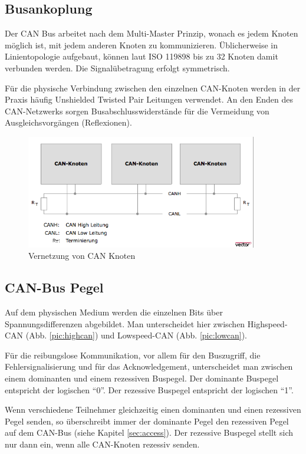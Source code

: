 \subsection{Busankoplung}

Der CAN Bus arbeitet nach dem Multi-Master Prinzip, wonach es jedem Knoten 
möglich ist, mit jedem anderen Knoten zu kommunizieren. Üblicherweise in 
Linientopologie aufgebaut, können laut ISO 119898 bis zu 32 Knoten damit
verbunden werden. Die Signalübetragung erfolgt symmetrisch.

Für die physische Verbindung zwischen den einzelnen CAN-Knoten werden in der Praxis
häufig Unshielded Twisted Pair Leitungen verwendet. An den Enden des CAN-Netzwerks 
sorgen Busabschlusswiderstände für die Vermeidung von Ausgleichsvorgängen (Reflexionen).

\begin{figure}[h] 
\centering
\includegraphics[width=0.9\textwidth]{figures/cannet}
\caption{Vernetzung von CAN Knoten \citep{VEC}} 
\label{pic:cannet}
\end{figure}

\subsection{CAN-Bus Pegel} 

Auf dem physischen Medium werden die einzelnen Bits über Spannungsdifferenzen
abgebildet. Man unterscheidet hier zwischen Highspeed-CAN (Abb. \ref{pic:highcan}) 
und Lowspeed-CAN (Abb. \ref{pic:lowcan}).

Für die reibungslose Kommunikation, vor allem für den Buszugriff, die Fehlersignalisierung 
und für das Acknowledgement, unterscheidet man zwischen einem dominanten und einem 
rezessiven Buspegel. Der dominante Buspegel entspricht der logischen ``0''. Der rezessive 
Buspegel entspricht der logischen ``1''. 

Wenn verschiedene Teilnehmer gleichzeitig einen dominanten und einen rezessiven Pegel senden, 
so überschreibt immer der dominante Pegel den rezessiven Pegel auf dem CAN-Bus (siehe 
Kapitel \ref{sec:access}). Der rezessive Buspegel stellt sich nur dann ein, wenn alle CAN-Knoten 
rezessiv senden. 

